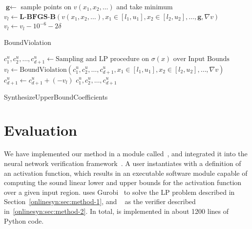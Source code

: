 \begin{algorithm}[t]
	\SetAlgoLined
	$\textbf{g} \gets $ sample points on $v(x_1,x_2,\dots)$ and take minimum\;
	$v_l \gets \textbf{L-BFGS-B}( v(x_1,x_2,\dots),
	x_1 \in [l_1, u_1], x_2 \in [l_2, u_2], \dots, \textbf{g}, \nabla v )$ \;
	$ v_l \gets v_l - 10^{-6} - 2\delta$\;
	\caption{BoundViolation\label{onlinesyn:alg:viol}}
\end{algorithm}
\begin{algorithm}[t]
	\SetAlgoLined
	$c_1^u, c_2^u, \dots, c_{d+1}^u \gets  \text{Sampling and LP procedure on }
	\sigma(x) \text{ over Input Bounds}$\;
	$v_l \gets \text{BoundViolation}(c_1^u, c_2^u, \dots, c_{d+1}^u, x_1 \in
	[l_1, u_1], x_2 \in [l_2, u_2], \dots, \nabla v)$\;
	$c_{d+1}^u \gets c_{d+1}^u + (-v_l)$\;
	\Return{} $c_1^u, c_2^u, \dots, c_{d+1}^u $\;
	\caption{SynthesizeUpperBoundCoefficients\label{onlinesyn:alg:synth}}
\end{algorithm}

\section{Evaluation}
\label{onlinesyn:sec:experiment}


We have implemented our method in a module called~\Name{}, and
integrated it into the \autolipra{} neural network verification framework~\cite{autolipra}.
A user instantiates \Name{} with a definition of an activation
function, which results in an executable software module capable of
computing the sound linear lower and upper bounds for the activation
function over a given input region.
%
\Name{} uses Gurobi~\cite{gurobi} to solve the LP problem described in
Section~\ref{onlinesyn:sec:method-1}, and \dReal{}~\cite{gao2013dreal} as the
verifier
described in~\ref{onlinesyn:sec:method-2}.
%
In total, \Name{} is implemented in about 1200 lines of Python
code.


